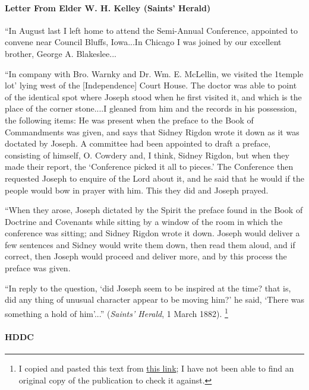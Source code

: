 		\paragraph{Letter From Elder W. H. Kelley (Saints' Herald)}
		
			``In August last I left home to attend the Semi-Annual Conference, appointed to convene near Council Bluffs, Iowa...In Chicago I was joined by our excellent brother, George A. Blakeslee...

			``In company with Bro. Warnky and Dr. Wm. E. McLellin, we visited the 1temple lot' lying west of the [Independence] Court House. The doctor was able to point of the identical spot where Joseph stood when he first visited it, and which is the place of the corner stone....I gleaned from him and the records in his possession, the following items: He was present when the preface to the Book of Commandments was given, and says that Sidney Rigdon wrote it down as it was doctated by Joseph. A committee had been appointed to draft a preface, consisting of himself, O. Cowdery and, I think, Sidney Rigdon, but when they made their report, the `Conference picked it all to pieces.' The Conference then requested Joseph to enquire of the Lord about it, and he said that he would if the people would bow in prayer with him. This they did and Joseph prayed.

			``When they arose, Joseph dictated by the Spirit the preface found in the Book of Doctrine and Covenants while sitting by a window of the room in which the conference was sitting; and Sidney Rigdon wrote it down. Joseph would deliver a few sentences and Sidney would write them down, then read them aloud, and if correct, then Joseph would proceed and deliver more, and by this process the preface was given.

			``In reply to the question, `did Joseph seem to be inspired at the time? that is, did any thing of unusual character appear to be moving him?' he said, `There was something a hold of him'...'' (\textit{Saints' Herald}, 1 March 1882).%
				\footnote{%
					I copied and pasted this text from \href{http://www.sidneyrigdon.com/dbroadhu/IA/sain1882.htm}{this link}; I have not been able to find an original copy of the publication to check it against.
					}
					
		\paragraph{HDDC}
		
